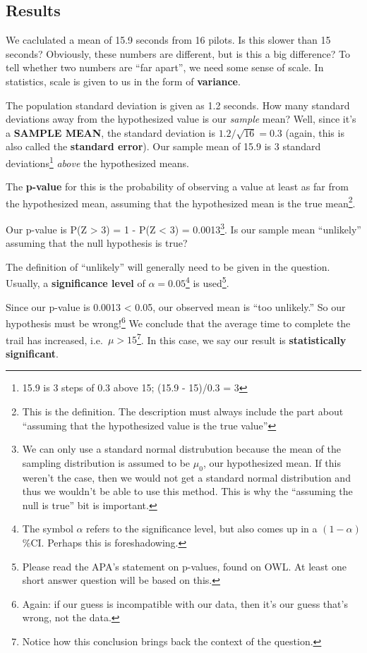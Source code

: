 \documentclass[
  letterpaper,
  DIV=11,
  numbers=noendperiod]{scrreprt}
\begin{document}
\hypertarget{results}{%
\subsection{Results}\label{results}}

We caclulated a mean of 15.9 seconds from 16 pilots. Is this slower than
15 seconds? Obviously, these numbers are different, but is this a big
difference? To tell whether two numbers are ``far apart'', we need some
sense of scale. In statistics, scale is given to us in the form of
\textbf{variance}.

The population standard deviation is given as 1.2 seconds. How many
standard deviations away from the hypothesized value is our
\emph{sample} mean? Well, since it's a \textbf{SAMPLE MEAN}, the
standard deviation is \(1.2/\sqrt{16} = 0.3\) (again, this is also
called the \textbf{standard error}). Our sample mean of 15.9 is 3
standard deviations\footnote{15.9 is 3 steps of 0.3 above 15; (15.9 -
  15)/0.3 = 3} \emph{above} the hypothesized means.

The \textbf{p-value} for this is the probability of observing a value at
least as far from the hypothesized mean, assuming that the hypothesized
mean is the true mean\footnote{This is the definition. The description
  must always include the part about ``assuming that the hypothesized
  value is the true value''}.

Our p-value is P(Z \textgreater{} 3) = 1 - P(Z \textless{} 3) =
0.0013\footnote{We can only use a standard normal distrubution because
  the mean of the sampling distribution is assumed to be \(\mu_0\), our
  hypothesized mean. If this weren't the case, then we would not get a
  standard normal distribution and thus we wouldn't be able to use this
  method. This is why the ``assuming the null is true'' bit is
  important.}. Is our sample mean ``unlikely'' assuming that the null
hypothesis is true?

The definition of ``unlikely'' will generally need to be given in the
question. Usually, a \textbf{significance level} of
\(\alpha = 0.05\)\footnote{The symbol \(\alpha\) refers to the
  significance level, but also comes up in a \((1-\alpha)\)\%CI. Perhaps
  this is foreshadowing.} is used\footnote{Please read the APA's
  statement on p-values, found on OWL. At least one short answer
  question will be based on this.}.

Since our p-value is 0.0013 \textless{} 0.05, our observed mean is ``too
unlikely.'' So our hypothesis must be wrong!\footnote{Again: if our
  guess is incompatible with our data, then it's our guess that's wrong,
  not the data.} We conclude that the average time to complete the trail
has increased, i.e.~\(\mu > 15\)\footnote{Notice how this conclusion
  brings back the context of the question.}. In this case, we say our
result is \textbf{statistically significant}.
\end{document}
